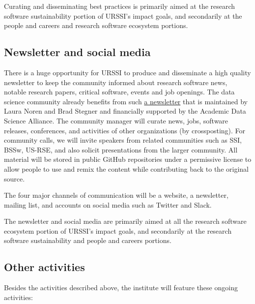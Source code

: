 \documentclass[
]{book}
\begin{document}
Curating and disseminating best practices is primarily aimed at the research software sustainability portion of URSSI's impact goals, and secondarily at the people and careers and research software ecosystem portions.

\hypertarget{newsletter-and-social-media}{%
\subsection{Newsletter and social media}\label{newsletter-and-social-media}}

There is a huge opportunity for URSSI to produce and disseminate a high quality newsletter to keep the community informed about research software news, notable research papers, critical software, events and job openings.
The data science community already benefits from such \href{https://cds.nyu.edu/newsletter/}{a newsletter} that is maintained by Laura Noren and Brad Stegner and financially supported by the Academic Data Science Alliance.
The community manager will curate news, jobs, software releases, conferences, and activities of other organizations (by crossposting).
For community calls, we will invite speakers from related communities such as SSI, BSSw, US-RSE, and also solicit presentations from the larger community.
All material will be stored in public GitHub repositories under a permissive license to allow people to use and remix the content while contributing back to the original source.

The four major channels of communication will be a website, a newsletter, mailing list, and accounts on social media such as Twitter and Slack.

The newsletter and social media are primarily aimed at all the research software ecosystem portion of URSSI's impact goals, and secondarily at the research software sustainability and people and careers portions.

\hypertarget{other-activities}{%
\subsection{Other activities}\label{other-activities}}

Besides the activities described above, the institute will feature these ongoing activities:
\end{document}

